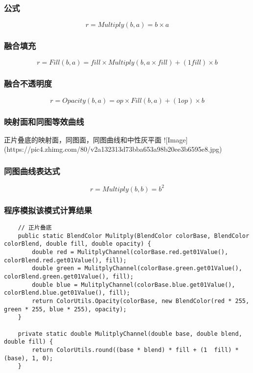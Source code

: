 \subsubsection{ 公式}

$$r=Multiply(b,a)=b\times a$$

\subsubsection{ 融合填充}

$$r= Fill(b,a) =fill\times Multiply(b,a\times fill)+(1fill)\times b$$

\subsubsection{ 融合不透明度}

$$r=Opacity(b,a)=op\times Fill(b,a)+(1op)\times b$$

\subsubsection{ 映射面和同图等效曲线}

正片叠底的映射面，同图面，同图曲线和中性灰平面
![Image](https://pic4.zhimg.com/80/v2a132313d73bba653a98b20ee3b6595e8.jpg)

\subsubsection{ 同图曲线表达式}

$$r=Multiply(b,b)= b^2$$

\subsubsection{ 程序模拟该模式计算结果}

\begin{lstlisting}
	// 正片叠底
	public static BlendColor Mulitply(BlendColor colorBase, BlendColor colorBlend, double fill, double opacity) {
		double red = MulitplyChannel(colorBase.red.get01Value(), colorBlend.red.get01Value(), fill);
		double green = MulitplyChannel(colorBase.green.get01Value(), colorBlend.green.get01Value(), fill);
		double blue = MulitplyChannel(colorBase.blue.get01Value(), colorBlend.blue.get01Value(), fill);
		return ColorUtils.Opacity(colorBase, new BlendColor(red * 255, green * 255, blue * 255), opacity);
	}
	
	private static double MulitplyChannel(double base, double blend, double fill) {
		return ColorUtils.round((base * blend) * fill + (1  fill) * (base), 1, 0);
	}
\end{lstlisting}



